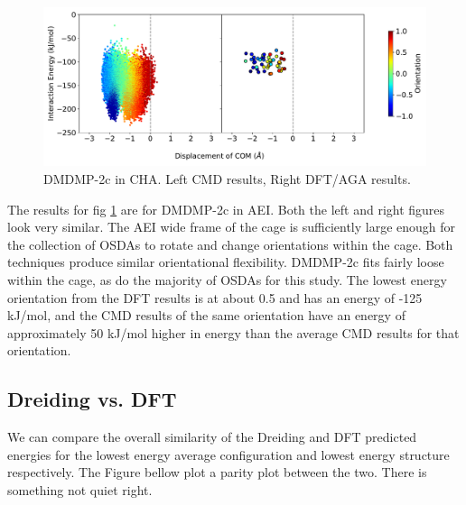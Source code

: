 \documentclass[journal=accacs,manuscript=article, email=true, layout=traditional]{achemso}
\begin{document}
\begin{figure}
\begin{center}

\includegraphics[scale=.5]{./Figures/AEI-GA-CMD-DMDMP_2c.pdf}
\caption{DMDMP-2c in CHA. Left CMD results, Right DFT/AGA results.} 
\label{fig:DMDMP-2c-AEI} 

\end{center}
\end{figure}

The results for fig \ref{fig:DMDMP-2c-AEI} are for DMDMP-2c in AEI. Both the left and right figures look very similar. The AEI wide frame of the cage is sufficiently large enough for the collection of OSDAs to rotate and change orientations within the cage. Both techniques produce similar orientational flexibility. DMDMP-2c fits fairly loose within the cage, as do the majority of OSDAs for this study. The lowest energy orientation from the DFT results is at about 0.5 and has an energy of -125 kJ/mol, and the CMD results of the same orientation have an energy of approximately 50 kJ/mol higher in energy than the average CMD results for that orientation. 

\subsection{Dreiding vs. DFT}
\label{sec:org459e950}
We can compare the overall similarity of the Dreiding and DFT predicted energies for the lowest energy average configuration and lowest energy structure respectively. The Figure bellow plot a parity plot between the two. There is something not quiet right.
\end{document}
